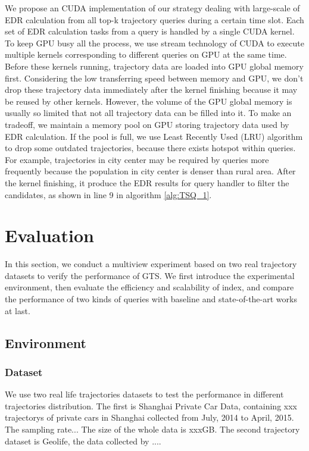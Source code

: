 \documentclass[conference]{IEEEtran}
\begin{document}
We propose an CUDA implementation of our strategy dealing with large-scale of EDR calculation from all top-k trajectory queries during a certain time slot. Each set of EDR calculation tasks from a query is handled by a single CUDA kernel. To keep GPU busy all the process, we use stream technology of CUDA to execute multiple kernels corresponding to different queries on GPU at the same time. Before these kernels running, trajectory data are loaded into GPU global memory first. Considering the low transferring speed between memory and GPU, we don't drop these trajectory data immediately after the kernel finishing because it may be reused by other kernels. However, the volume of the GPU global memory is usually so limited that not all trajectory data can be filled into it. To make an tradeoff, we maintain a memory pool on GPU storing trajectory data used by EDR calculation. If the pool is full, we use Least Recently Used (LRU) algorithm to drop some outdated trajectories, because there exists hotspot within queries. For example, trajectories in city center may be required by queries more frequently because the population in city center is denser than rural area. After the kernel finishing, it produce the EDR results for query handler to filter the candidates, as shown in line 9 in algorithm \ref{alg:TSQ_1}. 





\section{Evaluation}
In this section, we conduct a multiview experiment based on two real trajectory datasets to verify the performance of GTS. We first introduce the experimental environment, then evaluate the efficiency and scalability of index, and compare the performance of two kinds of queries with baseline and state-of-the-art works at last.
 
\subsection{Environment}
\subsubsection{Dataset}
We use two real life trajectories datasets to test the performance in different trajectories distribution. The first is Shanghai Private Car Data, containing xxx trajectorys of private cars in Shanghai collected from July, 2014 to April, 2015. The sampling rate...  The size of the whole data is xxxGB. The second trajectory dataset is Geolife, the data collected by ....
\end{document}
